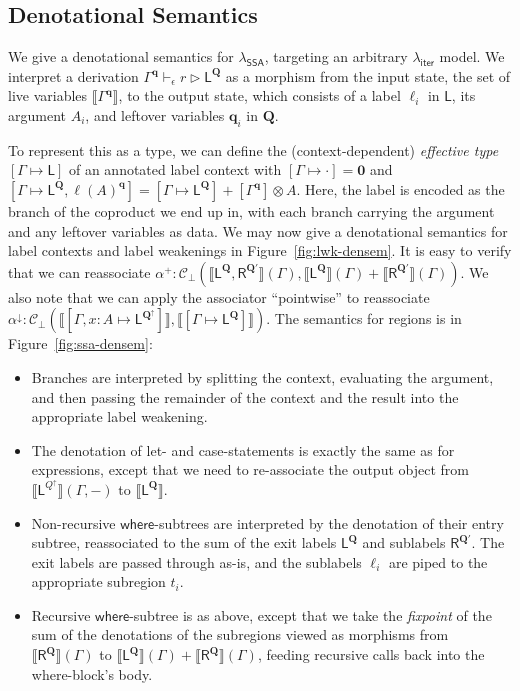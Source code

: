 \documentclass[acmsmall,screen,review]{acmart}
\newcommand{\mc}[1]{\ensuremath{\mathcal{#1}}}
\newcommand{\mb}[1]{\ensuremath{\mathbf{#1}}}
\newcommand{\ms}[1]{\ensuremath{\mathsf{#1}}}
\newcommand{\haslb}[4]{#1 \vdash_{#2} #3 \rhd #4}
\newcommand{\etoty}[1]{[#1]}
\newcommand{\ltoty}[2]{[#1 \mapsto #2]}
\newcommand{\dnt}[1]{\llbracket{#1}\rrbracket}
\newcommand{\subiterexp}{\texorpdfstring{\(\lambda_{\ms{iter}}\)}{lambda-iter}}
\newcommand{\isotopessa}{\(\lambda_{\ms{SSA}}\)}
\newcommand{\zeroqv}[1]{#1^\uparrow}
\begin{document}
\subsection{Denotational Semantics}

We give a denotational semantics for \isotopessa{}, targeting an arbitrary
\subiterexp{} model. We interpret a derivation
$\haslb{\Gamma^{\mb{q}}}{\epsilon}{r}{\ms{L}^{\mb{Q}}}$ as a morphism from the input state, the set
of live variables $\dnt{\Gamma^{\mb{q}}}$, to the output state, which consists of a label $\ell_i$
in $\ms{L}$, its argument $A_i$, and leftover variables $\mb{q}_i$ in $\mb{Q}$. 

To represent this as a type, we can define the (context-dependent) \emph{effective type}
$\ltoty{\Gamma}{\ms{L}}$ of an annotated label context with $\ltoty{\Gamma}{\cdot} = \mb{0}$ and
$\ltoty{\Gamma}{\ms{L}^{\mb{Q}}, \ell(A)^{\mb{q}}} = \ltoty{\Gamma}{\ms{L}^{\mb{Q}}} +
\etoty{\Gamma^{\mb{q}}} \otimes A$.    
Here, the label is encoded as the branch of the coproduct we end up in, with each branch carrying
the argument and any leftover variables as data. We may now give a denotational semantics for label 
contexts and label weakenings in Figure~\ref{fig:lwk-densem}. 
It is easy to verify that we can reassociate 
$
\alpha^+ : \mc{C}_\bot(
  \dnt{\ms{L}^{\mb{Q}}, \ms{R}^{\mb{Q}'}}(\Gamma),
  \dnt{\ms{L}^{\mb{Q}}}(\Gamma) + \dnt{\ms{R}^{\mb{Q}'}}(\Gamma)
)
$.
We also note that we can apply the 
associator ``pointwise'' to reassociate
$\alpha^\downarrow: \mc{C}_\bot(
  \dnt{\ltoty{\Gamma, x : A}{\ms{L}^{\zeroqv{\mb{Q}}}}}, 
  \dnt{\ltoty{\Gamma}{\ms{L}^{\mb{Q}}}}
)$. 
%
The semantics for regions is in Figure~\ref{fig:ssa-densem}:
\begin{itemize}
  \item Branches are interpreted by splitting the context, evaluating the argument,
  and then passing the remainder of the context and the result into the appropriate
  label weakening.
  \item The denotation of let- and case-statements is exactly the same as for expressions,
  except that we need to re-associate the output object from 
  $\dnt{\ms{L}^{\zeroqv{Q}}}(\Gamma, -)$ to $\dnt{\ms{L}^{\mb{Q}}}$.
  \item Non-recursive \ms{where}-subtrees are interpreted by the denotation of their entry subtree,
  reassociated to the sum of the exit labels $\ms{L}^{\mb{Q}}$ and sublabels $\ms{R}^{\mb{Q}'}$. The
  exit labels are passed through as-is, and the sublabels $\ell_i$ are piped to the appropriate
  subregion $t_i$.
  \item Recursive \ms{where}-subtree is as above, except that we take the \emph{fixpoint} of the sum
  of the denotations of the subregions viewed as morphisms from $\dnt{\ms{R}^{\mb{Q}}}(\Gamma)$
  to $\dnt{\ms{L}^{\mb{Q}}}(\Gamma) + \dnt{\ms{R}^{\mb{Q}}}(\Gamma)$, feeding recursive
  calls back into the  where-block's body.
\end{itemize}
\end{document}
